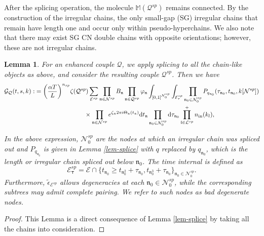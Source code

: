 \documentclass[UTF-8,reqno]{amsart}
\numberwithin{equation}{section}
\newtheorem{lemma}[theorem]{Lemma}
\theoremstyle{definition}
\def\dif{{\mathord{{\rm d}}}}
\def\geq{\geqslant}
\def\dif{{\mathord{{\rm d}}}}
\def\geq{\geqslant}
\begin{document}
After the splicing operation, the molecule $\mathbb{M}(\mathcal{Q}^{sp})$ remains connected. By the construction of the irregular chains, the only small-gap (SG) irregular chains that remain have length one and occur only within pseudo-hyperchains.
We also note that there may exist SG CN double chains with opposite orientations; however, these are not irregular chains. 

 
\begin{lemma} \label{cor-M}
For an enhanced couple $\mathcal{Q}$, we apply splicing to all the  chain-like objects as above, and  consider the resulting couple $\mathcal Q^{sp}$. Then we have
\begin{align*}
    \mathcal{G}_\mathcal{Q}(t,s,k) :&= \bigg(\frac{\alpha T}{L}\bigg)^{n_{sp}} \zeta(\mathcal{Q}^{sp}) \sum_{\mathcal{E}^{sp}}  %
    \prod_{\mathfrak{n}\in\mathcal{N}^{sp}}B_\mathfrak{n}\prod_{\mathfrak{n}\in\mathcal{Q}^{sp}}\varphi_\mathfrak{n}
\int_{[0,1]^{\mathcal{N}_0^{sp}}}\int_{\mathcal{E}^{sp}_\tau} \prod_{\mathfrak{n}_0\in \mathcal{N}_0^{sp}}P_{q_{\mathfrak{n}_0}}(\tau_{\mathfrak{n}_0}, t_{\mathfrak n_0}, k[\mathcal N^{sp}])\\
&\quad\quad\quad\quad\quad\quad\quad\quad\times\prod_{\mathfrak{n}\in\mathcal{N}^{sp}}  e^{\zeta_\mathfrak{n}2\pi i\Theta_\mathfrak{n}(t_\mathfrak{n}) } \dif t_\mathfrak{n}\prod_{\mathfrak{n}_0\in \mathcal{N}_0^{sp}}\dif \tau_{\mathfrak{n}_0}
\prod_{\mathfrak{l} \in \mathcal{L}^{sp}}^+ n_{\rm in}(k_l),
\end{align*}

In the above expression,  $\mathcal N_0^{sp}$ are the nodes at which an irregular chain was spliced out and $P_{q_{\mathfrak n_0}}$ is given in Lemma \ref{lem-splice} with $q$ replaced by $q_{\mathfrak n_0}$, which is the length or irregular chain spliced out below $\mathfrak n_0$.    The time internal is defined as 
  $$\mathcal{E}^{sp}_{\pmb{\tau}} = \mathcal E \cap \{t_{\mathfrak n_0} \geq t_{\mathfrak n_0^{2}} + \tau_{\mathfrak n_0}, t_{\mathfrak n_0^{3}} + \tau_{\mathfrak n_0}\}_{\mathfrak n_0 \in \mathcal N_0^{sp}}.$$
  Furthermore, $\tilde{\epsilon}_{\mathcal{E}^{sp}}$ allows degeneracies at each $\mathfrak{n}_0\in\mathcal{N}_0^{sp}$, while the corresponding subtrees may admit complete pairing. We refer to such nodes as bad degenerate nodes.
\end{lemma}
\begin{proof}
   This Lemma is  a direct consequence of Lemma  \ref{lem-splice} by taking all the chains into consideration.
\end{proof}
\end{document}
